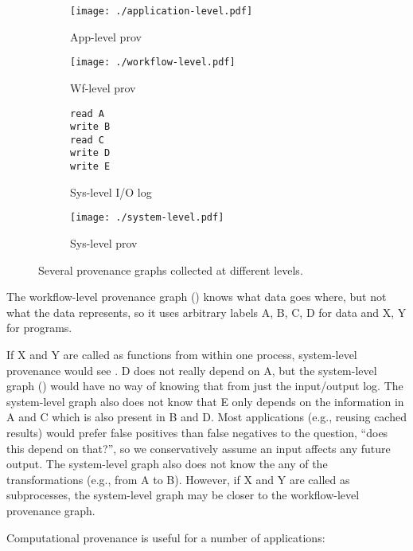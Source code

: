 \begin{figure}
\centering
\begin{subfigure}[b]{0.23\textwidth}
\centering
\texttt{[image: ./application-level.pdf]}
\caption{App-level prov}
\end{subfigure}
\hfill
\begin{subfigure}[b]{0.23\textwidth}
\centering
\texttt{[image: ./workflow-level.pdf]}
\caption{Wf-level prov}
\label{subfigure:workflow-level-graph}
\end{subfigure}
\hfill
\begin{subfigure}[b]{0.23\textwidth}
\begin{verbatim}
read A
write B
read C
write D
write E
\end{verbatim}
\caption{Sys-level I/O log}
\label{subfigure:system-level-log}
\end{subfigure}
\hfill
\begin{subfigure}[b]{0.23\textwidth}
\centering
\texttt{[image: ./system-level.pdf]}
\caption{Sys-level prov}
\label{subfigure:system-level-graph}
\end{subfigure}
\caption{Several provenance graphs collected at different levels.}
\label{figure:graphs}
\end{figure}

The workflow-level provenance graph () knows what data goes where, but not what the data represents, so it uses arbitrary labels A, B, C, D for data and X, Y for programs.

If X and Y are called as functions from within one process, system-level provenance would see .
D does not really depend on A, but the system-level graph () would have no way of knowing that from just the input/output log.
The system-level graph also does not know that E only depends on the information in A and C which is also present in B and D.
Most applications (e.g., reusing cached results) would prefer false positives than false negatives to the question, ``does this depend on that?'', so we conservatively assume an input affects any future output.
The system-level graph also does not know the any of the transformations (e.g., from A to B).
However, if X and Y are called as subprocesses, the system-level graph may be closer to the workflow-level provenance graph.

Computational provenance is useful for a number of applications:

